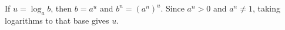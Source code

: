 If $u=\log_ab$, then $b=a^u$ and $b^n=(a^n)^u$. Since $a^n>0$ and $a^n\ne1$, taking logarithms to that base gives $u$.
